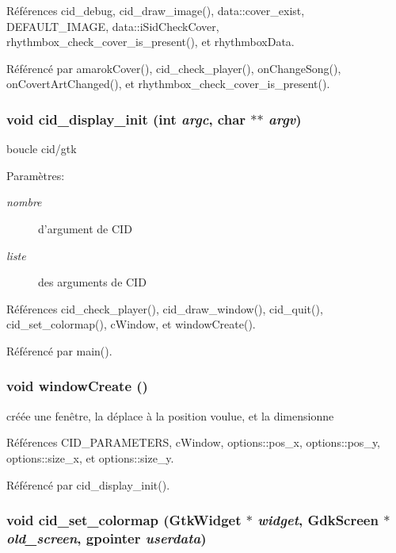 Références cid\_\-debug, cid\_\-draw\_\-image(), data::cover\_\-exist, DEFAULT\_\-IMAGE, data::iSidCheckCover, rhythmbox\_\-check\_\-cover\_\-is\_\-present(), et rhythmboxData.

Référencé par amarokCover(), cid\_\-check\_\-player(), onChangeSong(), onCovertArtChanged(), et rhythmbox\_\-check\_\-cover\_\-is\_\-present().
\subsubsection{\setlength{\rightskip}{0pt plus 5cm}void cid\_\-display\_\-init (int {\em argc}, \/  char $\ast$$\ast$ {\em argv})}\label{cid-gtk_8h_6d1ca9236cd558391793807b8e817130}


boucle cid/gtk \begin{Desc}
\item[Paramètres:]
\begin{description}
\item[{\em nombre}]d'argument de CID \item[{\em liste}]des arguments de CID \end{description}
\end{Desc}


Références cid\_\-check\_\-player(), cid\_\-draw\_\-window(), cid\_\-quit(), cid\_\-set\_\-colormap(), cWindow, et windowCreate().

Référencé par main().
\subsubsection{\setlength{\rightskip}{0pt plus 5cm}void windowCreate ()}\label{cid-gtk_8h_9b1cec11c1e104c0c8a1c96af4970c3c}


créée une fenêtre, la déplace à la position voulue, et la dimensionne 

Références CID\_\-PARAMETERS, cWindow, options::pos\_\-x, options::pos\_\-y, options::size\_\-x, et options::size\_\-y.

Référencé par cid\_\-display\_\-init().
\subsubsection{\setlength{\rightskip}{0pt plus 5cm}void cid\_\-set\_\-colormap (GtkWidget $\ast$ {\em widget}, \/  GdkScreen $\ast$ {\em old\_\-screen}, \/  gpointer {\em userdata})}\label{cid-gtk_8h_2839de6472a3afc45911b4856e156443}



